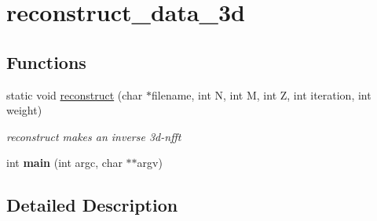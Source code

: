 \hypertarget{group__applications__mri3d__reconstruct__data__3d}{\section{reconstruct\-\_\-data\-\_\-3d}
\label{group__applications__mri3d__reconstruct__data__3d}
}
\subsection*{Functions}
\begin{DoxyCompactItemize}
\item 
\hypertarget{group__applications__mri3d__reconstruct__data__3d_ga6a872b7d27169c9b01e09dcf45b9737d}{static void \hyperlink{group__applications__mri3d__reconstruct__data__3d_ga6a872b7d27169c9b01e09dcf45b9737d}{reconstruct} (char $\ast$filename, int N, int M, int Z, int iteration, int weight)}\label{group__applications__mri3d__reconstruct__data__3d_ga6a872b7d27169c9b01e09dcf45b9737d}

\begin{DoxyCompactList}\small\item\em reconstruct makes an inverse 3d-\/nfft \end{DoxyCompactList}\item 
\hypertarget{group__applications__mri3d__reconstruct__data__3d_ga3c04138a5bfe5d72780bb7e82a18e627}{int {\bfseries main} (int argc, char $\ast$$\ast$argv)}\label{group__applications__mri3d__reconstruct__data__3d_ga3c04138a5bfe5d72780bb7e82a18e627}

\end{DoxyCompactItemize}


\subsection{Detailed Description}
